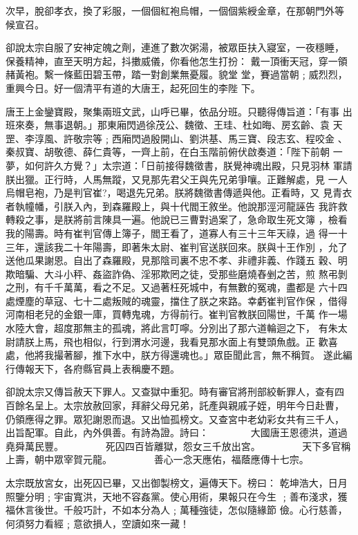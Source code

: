 \begin{pinyinscope}
{次早，脫卻孝衣，換了彩服，一個個紅袍烏帽，一個個紫綬金章，在那朝門外等
候宣召。

卻說太宗自服了安神定魄之劑，連進了數次粥湯，被眾臣扶入寢室，一夜穩睡，
保養精神，直至天明方起，抖擻威儀，你看他怎生打扮：
戴一頂衝天冠，穿一領赭黃袍。繫一條藍田碧玉帶，踏一對創業無憂履。貌堂
堂，賽過當朝﹔威烈烈，重興今日。好一個清平有道的大唐王，起死回生的李陛
下。

唐王上金鑾寶殿，聚集兩班文武，山呼已畢，依品分班。只聽得傳旨道：「有事
出班來奏，無事退朝。」那東廂閃過徐茂公、魏徵、王珪、杜如晦、房玄齡、袁
天罡、李淳風、許敬宗等﹔西廂閃過殷開山、劉洪基、馬三寶、段志玄、程咬金
、秦叔寶、胡敬德、薛仁貴等，一齊上前，在白玉階前俯伏啟奏道：「陛下前朝
一夢，如何許久方覺？」太宗道：「日前接得魏徵書，朕覺神魂出殿，只見羽林
軍請朕出獵。正行時，人馬無蹤，又見那先君父王與先兄弟爭嚷。正難解處，見
一人烏帽皂袍，乃是判官崔?，喝退先兄弟。朕將魏徵書傳遞與他。正看時，又
見青衣者執幢幡，引朕入內，到森羅殿上，與十代閻王敘坐。他說那涇河龍誣告
我許救轉殺之事，是朕將前言陳具一遍。他說已三曹對過案了，急命取生死文簿
，檢看我的陽壽。時有崔判官傳上簿子，閻王看了，道寡人有三十三年天祿，過
得一十三年，還該我二十年陽壽，即著朱太尉、崔判官送朕回來。朕與十王作別
，允了送他瓜果謝恩。自出了森羅殿，見那陰司裏不忠不孝、非禮非義、作踐五
穀、明欺暗騙、大斗小秤、姦盜詐偽、淫邪欺罔之徒，受那些磨燒舂剉之苦，煎
熬弔剝之刑，有千千萬萬，看之不足。又過著枉死城中，有無數的冤魂，盡都是
六十四處煙塵的草寇、七十二處叛賊的魂靈，擋住了朕之來路。幸虧崔判官作保
，借得河南相老兒的金銀一庫，買轉鬼魂，方得前行。崔判官教朕回陽世，千萬
作一場水陸大會，超度那無主的孤魂，將此言叮嚀。分別出了那六道輪迴之下，
有朱太尉請朕上馬，飛也相似，行到渭水河邊，我看見那水面上有雙頭魚戲。正
歡喜處，他將我撮著腳，推下水中，朕方得還魂也。」眾臣聞此言，無不稱賀。
遂此編行傳報天下，各府縣官員上表稱慶不題。

卻說太宗又傳旨赦天下罪人。又查獄中重犯。時有審官將刑部絞斬罪人，查有四
百餘名呈上。太宗放赦回家，拜辭父母兄弟，託產與親戚子姪，明年今日赴曹，
仍領應得之罪。眾犯謝恩而退。又出恤孤榜文。又查宮中老幼彩女共有三千人，
出旨配軍。自此，內外俱善。有詩為證。詩曰：
　　　　大國唐王恩德洪，道過堯舜萬民豐。
　　　　死囚四百皆離獄，怨女三千放出宮。
　　　　天下多官稱上壽，朝中眾宰賀元龍。
　　　　善心一念天應佑，福蔭應傳十七宗。

太宗既放宮女，出死囚已畢，又出御製榜文，遍傳天下。榜曰：
乾坤浩大，日月照鑒分明﹔宇宙寬洪，天地不容姦黨。使心用術，果報只在今生
﹔善布淺求，獲福休言後世。千般巧計，不如本分為人﹔萬種強徒，怎似隨緣節
儉。心行慈善，何須努力看經﹔意欲損人，空讀如來一藏！

}
\end{pinyinscope}
